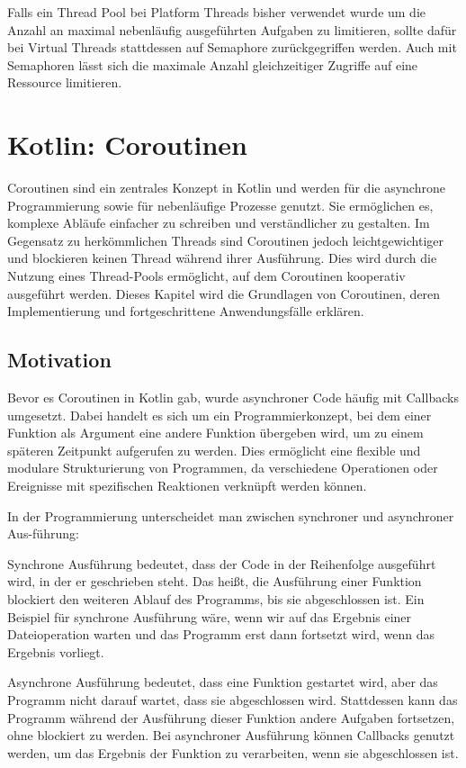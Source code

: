 \documentclass[fontsize=12pt,paper=a4,twoside=semi,parskip=half-,headsepline,headinclude]{scrreprt}
\begin{document}
Falls ein Thread Pool bei Platform Threads bisher verwendet wurde um die Anzahl an maximal nebenläufig ausgeführten Aufgaben zu limitieren, sollte dafür bei Virtual Threads stattdessen auf Semaphore zurückgegriffen werden. Auch mit Semaphoren lässt sich die maximale Anzahl gleichzeitiger Zugriffe auf eine Ressource limitieren.

\newpage

\section{Kotlin: Coroutinen}

Coroutinen sind ein zentrales Konzept in Kotlin und werden für die asynchrone Programmierung sowie für nebenläufige Prozesse genutzt. Sie ermöglichen es, komplexe Abläufe einfacher zu schreiben und verständlicher zu gestalten. Im Gegensatz zu herkömmlichen Threads sind Coroutinen jedoch leichtgewichtiger und blockieren keinen Thread während ihrer Ausführung. Dies wird durch die Nutzung eines Thread-Pools ermöglicht, auf dem Coroutinen kooperativ ausgeführt werden. Dieses Kapitel wird die Grundlagen von Coroutinen, deren Implementierung und fortgeschrittene Anwendungsfälle erklären.



\subsection{Motivation}

Bevor es Coroutinen in Kotlin gab, wurde asynchroner Code häufig mit Callbacks umgesetzt. Dabei handelt es sich um ein Programmierkonzept, bei dem einer Funktion als Argument eine andere Funktion übergeben wird, um zu einem späteren Zeitpunkt aufgerufen zu werden. Dies ermöglicht eine flexible und modulare Strukturierung von Programmen, da verschiedene Operationen oder Ereignisse mit spezifischen Reaktionen verknüpft werden können. 

In der Programmierung unterscheidet man zwischen synchroner und asynchroner Aus-führung:

Synchrone Ausführung bedeutet, dass der Code in der Reihenfolge ausgeführt wird, in der er geschrieben steht. Das heißt, die Ausführung einer Funktion blockiert den weiteren Ablauf des Programms, bis sie abgeschlossen ist. Ein Beispiel für synchrone Ausführung wäre, wenn wir auf das Ergebnis einer Dateioperation warten und das Programm erst dann fortsetzt wird, wenn das Ergebnis vorliegt.

Asynchrone Ausführung bedeutet, dass eine Funktion gestartet wird, aber das Programm nicht darauf wartet, dass sie abgeschlossen wird. Stattdessen kann das Programm während der Ausführung dieser Funktion andere Aufgaben fortsetzen, ohne blockiert zu werden. Bei asynchroner Ausführung können Callbacks genutzt werden, um das Ergebnis der Funktion zu verarbeiten, wenn sie abgeschlossen ist.
\end{document}
